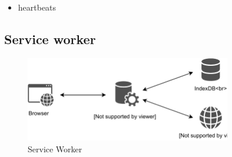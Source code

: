 \begin{itemize}
	\item heartbeats
\end{itemize}

\subsection{Service worker}

\begin{figure}[!h]
	\centering
	\includegraphics[width=0.8\textwidth]{figures/ServiceWorker}
	\caption[A Figure Short-Title]{Service Worker}
	\label{fig:serviceWorker}
\end{figure}

